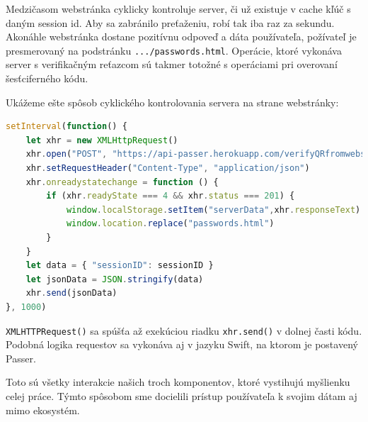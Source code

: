 Medzičasom webstránka cyklicky kontroluje server, či už existuje v cache kľúč s daným session id. Aby sa zabránilo preťaženiu, robí tak iba raz za sekundu. Akonáhle webstránka dostane pozitívnu odpoveď a dáta používateľa, požívateľ je presmerovaný na podstránku \texttt{.../passwords.html}. Operácie, ktoré vykonáva server s verifikačným reťazcom sú takmer totožné s operáciami pri overovaní šesťciferného kódu.

Ukážeme ešte spôsob cyklického kontrolovania servera na strane webstránky:
\newpage
\begin{lstlisting}[language=JavaScript, basicstyle=\small]
setInterval(function() {
    let xhr = new XMLHttpRequest()
    xhr.open("POST", "https://api-passer.herokuapp.com/verifyQRfromwebsite", true)
    xhr.setRequestHeader("Content-Type", "application/json")
    xhr.onreadystatechange = function () {
        if (xhr.readyState === 4 && xhr.status === 201) {
            window.localStorage.setItem("serverData",xhr.responseText)
            window.location.replace("passwords.html")
        }
    }
    let data = { "sessionID": sessionID }
    let jsonData = JSON.stringify(data)
    xhr.send(jsonData)
}, 1000) 
\end{lstlisting}
\leavevmode\newline
\indent \texttt{XMLHTTPRequest()} sa spúšťa až exekúciou riadku \texttt{xhr.send()} v dolnej časti kódu. Podobná logika requestov sa vykonáva aj v jazyku Swift, na ktorom je postavený Passer.

\leavevmode\newline
\indent Toto sú všetky interakcie našich troch komponentov, ktoré vystihujú myšlienku celej práce. Týmto spôsobom sme docielili prístup používateľa k svojim dátam aj mimo ekosystém.